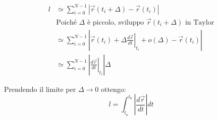 \begin{figure}[ht!]
\end{figure}

\begin{align*}
l &\simeq \sum_{i=0}^{N-1} \left|\vec r(t_i+\Delta) - \vec r(t_i)\right| \\[4pt]
    &\text{Poiché }\Delta \text{ è piccolo, sviluppo } \vec r(t_i+\Delta) \text{ in Taylor} \\[4pt]
    &\simeq \sum_{i=0}^{N-1}
    \left|
    \vec r(t_i) +
    \Delta \left.\frac{d\vec r}{dt}\right|_{t_i}
    + o(\Delta)
    - \vec r(t_i)
    \right| \\[4pt]
    &\simeq \sum_{i=0}^{N-1}
    \left|
    \left.\frac{d\vec r}{dt}\right|_{t_i}
    \right| \Delta
\end{align*}

Prendendo il limite per $\Delta \to 0$ ottengo:
\begin{equation*}
    l = \int_{t_a}^{t_b} \left| \frac{d\vec r}{dt} \right| dt
\end{equation*}

